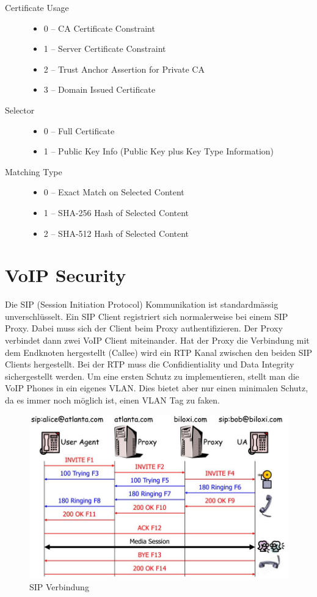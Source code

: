 \begin{description}
	\item[Certificate Usage] \hfill
	\begin{itemize}
		\item 0 – CA Certificate Constraint
		\item 1 – Server Certificate Constraint
		\item 2 – Trust Anchor Assertion for Private CA
		\item 3 – Domain Issued Certificate
	\end{itemize}
	\item[Selector] \hfill
	\begin{itemize}
		\item 0 – Full Certificate
		\item 1 – Public Key Info (Public Key plus Key Type Information)
	\end{itemize}
	\item[Matching Type] \hfill
	\begin{itemize}
		\item 0 – Exact Match on Selected Content
		\item 1 – SHA-256 Hash of Selected Content
		\item 2 – SHA-512 Hash of Selected Content
	\end{itemize}
\end{description}


\section{VoIP Security}
Die SIP (Session Initiation Protocol) Kommunikation ist standardmässig unverschlüsselt. Ein SIP Client registriert sich normalerweise bei einem SIP Proxy. Dabei muss sich der Client beim Proxy authentifizieren. Der Proxy verbindet dann zwei VoIP Client miteinander. Hat der Proxy die Verbindung mit dem Endknoten hergestellt (Callee) wird ein RTP Kanal zwischen den beiden SIP Clients hergestellt. Bei der RTP muss die Confidientiality und Data Integrity sichergestellt werden. Um eine ersten Schutz zu implementieren, stellt man die VoIP Phones in ein eigenes VLAN. Dies bietet aber nur einen minimalen Schutz, da es immer noch möglich ist, einen VLAN Tag zu faken. 

\begin{figure}[h]
\centering
\includegraphics[width=0.7\linewidth]{images/sip_connection}
\caption{SIP Verbindung}
\label{fig:sipconnection}
\end{figure}

